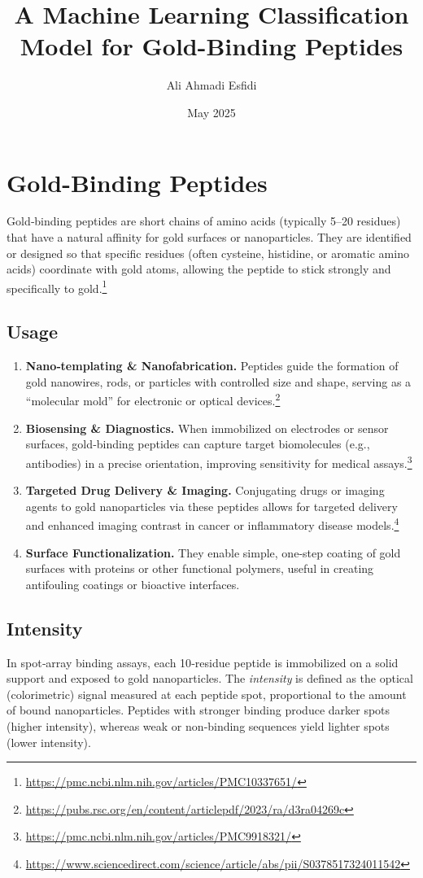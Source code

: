 \documentclass{article}
\title{A Machine Learning Classification Model for Gold-Binding Peptides}
\author{Ali Ahmadi Esfidi}
\date{May 2025}
\begin{document}
\maketitle

\section{Gold-Binding Peptides}
Gold‐binding peptides are short chains of amino acids (typically 5–20 residues) that have a natural affinity for gold surfaces or nanoparticles. They are identified or designed so that specific residues (often cysteine, histidine, or aromatic amino acids) coordinate with gold atoms, allowing the peptide to stick strongly and specifically to gold.\footnote{\url{https://pmc.ncbi.nlm.nih.gov/articles/PMC10337651/}}

\subsection{Usage}
\begin{enumerate}
  \item \textbf{Nano‐templating \& Nanofabrication.} Peptides guide the formation of gold nanowires, rods, or particles with controlled size and shape, serving as a “molecular mold” for electronic or optical devices.\footnote{\url{https://pubs.rsc.org/en/content/articlepdf/2023/ra/d3ra04269c}}
  \item \textbf{Biosensing \& Diagnostics.} When immobilized on electrodes or sensor surfaces, gold‐binding peptides can capture target biomolecules (e.g., antibodies) in a precise orientation, improving sensitivity for medical assays.\footnote{\url{https://pmc.ncbi.nlm.nih.gov/articles/PMC9918321/}}
  \item \textbf{Targeted Drug Delivery \& Imaging.} Conjugating drugs or imaging agents to gold nanoparticles via these peptides allows for targeted delivery and enhanced imaging contrast in cancer or inflammatory disease models.\footnote{\url{https://www.sciencedirect.com/science/article/abs/pii/S0378517324011542}}
  \item \textbf{Surface Functionalization.} They enable simple, one‐step coating of gold surfaces with proteins or other functional polymers, useful in creating antifouling coatings or bioactive interfaces.
\end{enumerate}

\subsection{Intensity}
In spot‐array binding assays, each 10‐residue peptide is immobilized on a solid support and exposed to gold nanoparticles. The \emph{intensity} is defined as the optical (colorimetric) signal measured at each peptide spot, proportional to the amount of bound nanoparticles. Peptides with stronger binding produce darker spots (higher intensity), whereas weak or non‐binding sequences yield lighter spots (lower intensity).
\end{document}
